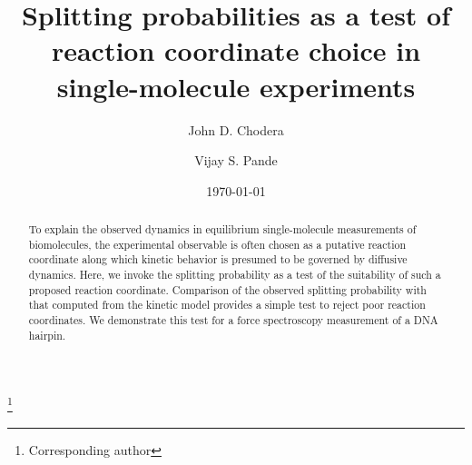 \documentclass[aps,prl,twocolumn,superscriptaddress,floatfix]{revtex4-1}
\begin{document}

\title{Splitting probabilities as a test of reaction coordinate choice in single-molecule experiments}

 \author{John D. Chodera}
 
\author{Vijay S. Pande}
 \thanks{Corresponding author}

\date{\today}


\begin{abstract}
To explain the observed dynamics in equilibrium single-molecule measurements of biomolecules, the experimental observable is often chosen as a putative reaction coordinate along which kinetic behavior is presumed to be governed by diffusive dynamics. 
Here, we invoke the splitting probability as a test of the suitability of such a proposed reaction coordinate.  Comparison of the observed splitting probability with that computed from the kinetic model provides a simple test to reject poor reaction coordinates.  
We demonstrate this test for a force spectroscopy measurement of a DNA hairpin.
\end{abstract}


\maketitle


\end{document}
